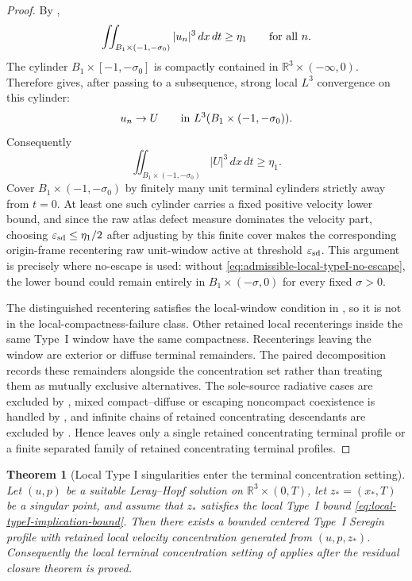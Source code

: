 \documentclass[11pt]{amsart}
\numberwithin{equation}{section}
\theoremstyle{plain}
\newtheorem{theorem}{Theorem}[section]
\theoremstyle{definition}
\theoremstyle{remark}
\newcommand{\R}{\mathbb R}
\newcommand{\eps}{\varepsilon}
\begin{document}
\begin{proof}
By ,
\[
   \iint_{B_1\times(-1,-\sigma_0)} |u_n|^3\,dx\,dt\ge\eta_1
   \qquad\hbox{for all }n .
\]
The cylinder \(B_1\times[-1,-\sigma_0]\) is compactly contained in
\(\mathbb R^3\times(-\infty,0)\).  Therefore
 gives, after passing to a
subsequence, strong local \(L^3\) convergence on this cylinder:
\[
   u_n\to U
   \qquad\hbox{in }L^3(B_1\times(-1,-\sigma_0)).
\]
Consequently
\[
   \iint_{B_1\times(-1,-\sigma_0)} |U|^3\,dx\,dt\ge\eta_1 .
\]
Cover \(B_1\times(-1,-\sigma_0)\) by finitely many unit terminal cylinders
strictly away from \(t=0\).  At least one such cylinder carries a fixed positive
velocity lower bound, and since the raw atlas defect measure dominates the velocity
part, choosing \(\eps_{\rm sd}\le\eta_1/2\) after adjusting by this finite cover
makes the corresponding origin-frame recentering raw unit-window active at
threshold \(\eps_{\rm sd}\).
This argument is precisely where no-escape is used: without
\eqref{eq:admissible-local-typeI-no-escape}, the lower bound could remain
entirely in \(B_1\times(-\sigma,0)\) for every fixed \(\sigma>0\).

The distinguished recentering satisfies the local-window condition in
, so it is not in the
local-compactness-failure class.  Other retained local recenterings inside the
same Type~I window have the same compactness.  Recenterings leaving the window
are exterior or diffuse terminal remainders.  The paired decomposition
 records these remainders alongside the
concentration set rather than treating them as mutually exclusive alternatives.  The
sole-source radiative cases are excluded by
, mixed compact--diffuse or
escaping noncompact coexistence is handled by
, and infinite chains of retained concentrating descendants are excluded
by .  Hence
 leaves only a single retained concentrating
terminal profile or a finite separated family of retained concentrating terminal
profiles.
\end{proof}

\begin{theorem}[Local Type I singularities enter the terminal concentration setting]
\label{thm:local-typeI-entry-or-exclusion}
Let \((u,p)\) be a suitable Leray--Hopf solution on
\(\R^3\times(0,T)\), let \(z_*=(x_*,T)\) be a singular point, and assume that
\(z_*\) satisfies the local Type~I bound
\eqref{eq:local-typeI-implication-bound}.  Then there exists a bounded centered
Type~I Seregin profile with retained local velocity concentration generated from
\((u,p,z_*)\).  Consequently the local terminal concentration setting of
 applies after the residual
closure theorem is proved.
\end{theorem}
\end{document}
